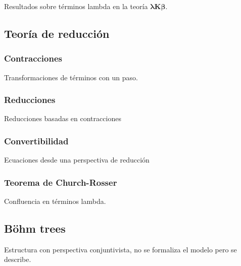 Resultados sobre términos lambda en la teoría \(\boldsymbol{\lambda K \beta}\).

\subsection{Teoría de reducción}

\subsubsection{Contracciones}

Transformaciones de términos con un paso.

\subsubsection{Reducciones}

Reducciones basadas en contracciones

\subsubsection{Convertibilidad}

Ecuaciones desde una perspectiva de reducción

\subsubsection{Teorema de Church-Rosser}

Confluencia en términos lambda.

\subsection{Böhm trees}

Estructura con perspectiva conjuntivista, no se formaliza el modelo pero se
describe.

